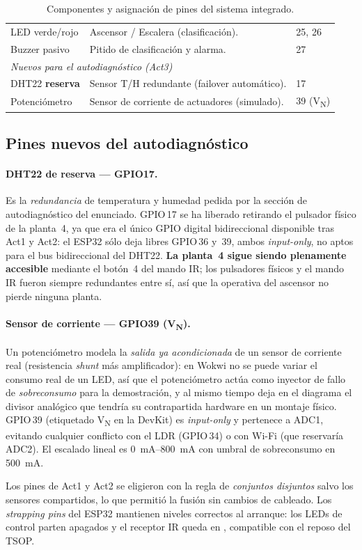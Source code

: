 \begin{table}[H]
\begin{tabular}{p{} p{} p{}}
    LED verde/rojo       & Ascensor / Escalera (clasificación).           & 25, 26 \\
    Buzzer pasivo        & Pitido de clasificación y alarma.              & 27 \\
    \midrule
    \multicolumn{3}{l}{\emph{Nuevos para el autodiagnóstico (Act3)}}\\
    DHT22 \textbf{reserva} & Sensor T/H redundante (failover automático). & 17 \\
    Potenciómetro          & Sensor de corriente de actuadores (simulado).& 39 (V\textsubscript{N}) \\
    \bottomrule
  \end{tabular}
  \caption{Componentes y asignación de pines del sistema integrado.}
  \label{tab:componentes}
\end{table}

\subsection{Pines nuevos del autodiagnóstico}

\paragraph{DHT22 de reserva — GPIO17.}
Es la \emph{redundancia} de temperatura y humedad pedida por la sección de
autodiagnóstico del enunciado. GPIO\,17 se ha liberado retirando el pulsador
físico de la planta~4, ya que era el único GPIO digital bidireccional
disponible tras Act1 y Act2: el ESP32 sólo deja libres GPIO\,36 y~39, ambos
\emph{input-only}, no aptos para el bus bidireccional del DHT22.
\textbf{La planta~4 sigue siendo plenamente accesible} mediante el botón~4
del mando IR; los pulsadores físicos y el mando IR fueron siempre redundantes
entre sí, así que la operativa del ascensor no pierde ninguna planta.

\paragraph{Sensor de corriente — GPIO39 (V\textsubscript{N}).}
Un potenciómetro modela la \emph{salida ya acondicionada} de un sensor de
corriente real (resistencia \emph{shunt} más amplificador): en Wokwi no se
puede variar el consumo real de un LED, así que el potenciómetro actúa como
inyector de fallo de \emph{sobreconsumo} para la demostración, y al mismo
tiempo deja en el diagrama el divisor analógico que tendría su contrapartida
hardware en un montaje físico. GPIO\,39 (etiquetado V\textsubscript{N} en la
DevKit) es \emph{input-only} y pertenece a ADC1, evitando cualquier conflicto
con el LDR (GPIO\,34) o con Wi-Fi (que reservaría ADC2). El escalado lineal
es \SIrange{0}{800}{\milli\ampere} con umbral de sobreconsumo en
\SI{500}{\milli\ampere}.

Los pines de Act1 y Act2 se eligieron con la regla de \emph{conjuntos
disjuntos} salvo los sensores compartidos, lo que permitió la fusión sin
cambios de cableado. Los \emph{strapping pins} del ESP32
\cite{espressif_esp32} mantienen niveles correctos al arranque: los LEDs de
control parten apagados y el receptor IR queda en , compatible
con el reposo del TSOP.
